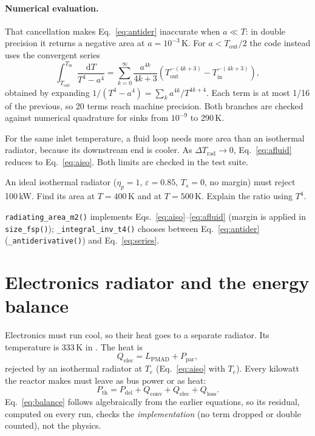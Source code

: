 \documentclass[11pt]{article}
\numberwithin{equation}{section}
\numberwithin{table}{section}
\newcommand{\Pdel}{P_\text{del}}
\newcommand{\Pth}{P_\text{th}}
\begin{document}
\paragraph{Numerical evaluation.} That cancellation makes Eq.~\eqref{eq:antider}
inaccurate when $a\ll T$: in double precision it returns a negative area at
$a=10^{-3}$\,K. For $a<T_\text{out}/2$ the code instead uses the convergent series
\begin{equation}
  \int_{T_\text{out}}^{T_\text{in}}\frac{\mathrm{d}T}{T^4-a^4}
  = \sum_{k=0}^{\infty}\frac{a^{4k}}{4k+3}\left(T_\text{out}^{-(4k+3)} - T_\text{in}^{-(4k+3)}\right),
  \label{eq:series}
\end{equation}
obtained by expanding $1/(T^4-a^4)=\sum_k a^{4k}/T^{4k+4}$. Each term is at most 1/16
of the previous, so 20 terms reach machine precision. Both branches are checked
against numerical quadrature for sinks from $10^{-9}$ to 290\,K.

\begin{physics}
For the same inlet temperature, a fluid loop needs more area than an isothermal
radiator, because its downstream end is cooler. As $\Delta T_\text{rad}\to0$,
Eq.~\eqref{eq:afluid} reduces to Eq.~\eqref{eq:aiso}. Both limits are checked in the
test suite.
\end{physics}

\begin{tryit}[label=try:rad]
An ideal isothermal radiator ($\eta_p=1$, $\varepsilon=0.85$, $T_s=0$, no margin) must reject
100\,kW. Find its area at $T=400$\,K and at $T=500$\,K. Explain the ratio using $T^4$.
\end{tryit}

\begin{code}
\texttt{radiating\_area\_m2()} implements Eqs.~\eqref{eq:aiso}--\eqref{eq:afluid}
(margin is applied in \texttt{size\_fsp()}); \texttt{\_integral\_inv\_t4()} chooses
between Eq.~\eqref{eq:antider} (\texttt{\_antiderivative()}) and Eq.~\eqref{eq:series}.
\end{code}

\section{Electronics radiator and the energy balance}\label{sec:elec}
Electronics must run cool, so their heat goes to a separate radiator. Its
temperature is 333\,K in \cite{mason2025trades}. The heat is
\begin{equation}
  Q_\text{elec} = L_\text{PMAD} + P_\text{par},
  \label{eq:qelec}
\end{equation}
rejected by an isothermal radiator at $T_e$ (Eq.~\eqref{eq:aiso} with $T_e$). Every
kilowatt the reactor makes must leave as bus power or as heat:
\begin{equation}
  \Pth = \Pdel + Q_\text{conv} + Q_\text{elec} + Q_\text{loss}.
  \label{eq:balance}
\end{equation}
Eq.~\eqref{eq:balance} follows algebraically from the earlier equations, so its
residual, computed on every run, checks the \emph{implementation} (no term dropped or
double counted), not the physics.
\end{document}
